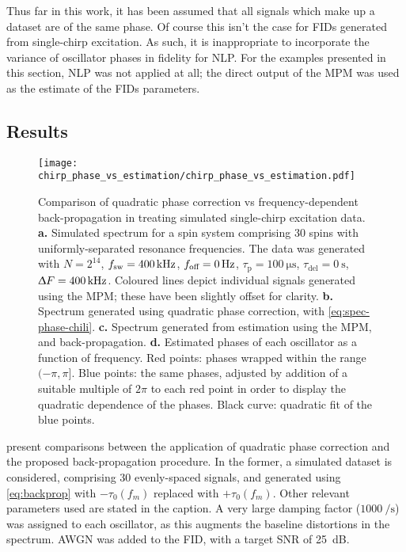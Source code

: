 Thus far in this work, it has been assumed that all signals which make up a
dataset are of the same phase. Of course this isn't the case for \acp{FID}
generated from single-chirp excitation. As such, it is inappropriate to
incorporate the variance of oscillator phases in fidelity for \ac{NLP}.
For the examples presented in this section, \ac{NLP} was not applied at all;
the direct output of the \ac{MPM} was used as the estimate of the \acp{FID}
parameters.

\subsection{Results}
\begin{figure}
    \centering
    \texttt{[image: chirp\_phase\_vs\_estimation/chirp\_phase\_vs\_estimation.pdf]}
    \caption[
        Comparison of quadratic phase correction vs frequency-dependent
        back-propagation in treating simulated single-chirp excitation data.
    ]
    {
        Comparison of quadratic phase correction vs frequency-dependent
        back-propagation in treating simulated single-chirp excitation data.
        \textbf{a.} Simulated spectrum for a spin system comprising 30 spins
        with uniformly-separated resonance frequencies. The data was generated
        with
        $N=2^{14}$,
        $f_{\mathrm{sw}}=\qty{400}{\kilo\hertz}$,
        $f_{\text{off}}=\qty{0}{\hertz}$,
        $\tau_{\text{p}} = \qty{100}{\micro\second}$,
        $\tau_{\text{del}} = \qty{0}{\second}$,
        $\Updelta F = \qty{400}{\kilo\hertz}$.
        Coloured lines depict individual signals generated using the \ac{MPM};
        these have been slightly offset for clarity.
        \textbf{b.} Spectrum generated using quadratic phase correction, with
        \cref{eq:spec-phase-chili}.
        \textbf{c.} Spectrum generated from estimation using the \ac{MPM}, and
        back-propagation.
        \textbf{d.} Estimated phases of each oscillator as a function of
        frequency. Red points: phases wrapped within the range $(-\pi, \pi]$.
        Blue points: the same phases, adjusted by addition of a suitable multiple
        of $2 \pi$ to each red point in order to display the quadratic
        dependence of the phases. Black curve: quadratic fit of the blue
        points.
    }
    \label{fig:bbqchili-sim}
\end{figure}
 present comparisons
between the application of quadratic phase correction and the proposed
back-propagation procedure. In the former, a simulated
dataset is considered, comprising 30 evenly-spaced signals, and generated using
\cref{eq:backprop} with $-\tau_0(f_m)$ replaced with $+\tau_0(f_m)$. Other
relevant parameters used are stated in the caption.
A very large damping factor ($\qty{1000}{\per\second}$) was assigned to each
oscillator, as this augments the baseline distortions in the spectrum.
\ac{AWGN} was added to the \ac{FID}, with a target \ac{SNR} of
\qty{25}{\deci\bel}.

